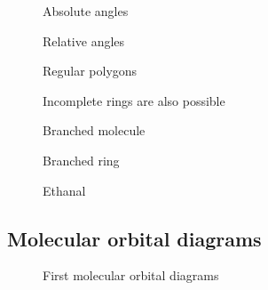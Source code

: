 \begin{figure}[!ht]
    \caption{Absolute angles}
\end{figure}


\begin{figure}[!ht]
    \caption{Relative angles}
\end{figure}


\begin{figure}[!ht]
    \caption{Regular polygons}
\end{figure}

\begin{figure}[!ht]
    \caption{Incomplete rings are also possible}
\end{figure}

\begin{figure}[!ht]
    \caption{Branched molecule}
\end{figure}

\begin{figure}
    \caption{Branched ring}
\end{figure}

\begin{figure}[!ht]
{\huge 
    \chemname
    {}    
    {Ethanal}
}
\end{figure}

\newpage
\subsection*{Molecular orbital diagrams}
\begin{figure}[!ht]
        \begin{modiagram}
        \end{modiagram}
    \caption{First molecular orbital diagrams}
\end{figure}

\begin{figure}[!ht]
\begin{modiagram}


 \end{modiagram}
 \end{figure}

